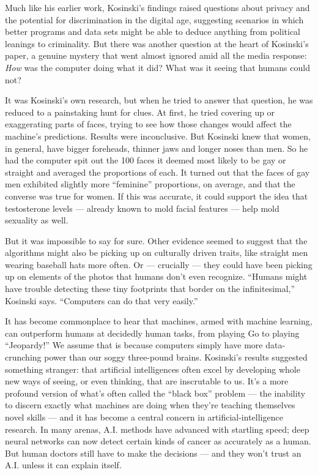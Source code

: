 Much like his earlier work, Kosinski's findings raised questions about
privacy and the potential for discrimination in the digital age,
suggesting scenarios in which better programs and data sets might be
able to deduce anything from political leanings to criminality. But
there was another question at the heart of Kosinski's paper, a genuine
mystery that went almost ignored amid all the media response: \emph{How}
was the computer doing what it did? What was it seeing that humans could
not?

It was Kosinski's own research, but when he tried to answer that
question, he was reduced to a painstaking hunt for clues. At first, he
tried covering up or exaggerating parts of faces, trying to see how
those changes would affect the machine's predictions. Results were
inconclusive. But Kosinski knew that women, in general, have bigger
foreheads, thinner jaws and longer noses than men. So he had the
computer spit out the 100 faces it deemed most likely to be gay or
straight and averaged the proportions of each. It turned out that the
faces of gay men exhibited slightly more ``feminine'' proportions, on
average, and that the converse was true for women. If this was accurate,
it could support the idea that testosterone levels --- already known to
mold facial features --- help mold sexuality as well.

But it was impossible to say for sure. Other evidence seemed to suggest
that the algorithms might also be picking up on culturally driven
traits, like straight men wearing baseball hats more often. Or ---
crucially --- they could have been picking up on elements of the photos
that humans don't even recognize. ``Humans might have trouble detecting
these tiny footprints that border on the infinitesimal,'' Kosinski says.
``Computers can do that very easily.''

It has become commonplace to hear that machines, armed with machine
learning, can outperform humans at decidedly human tasks, from playing
Go to playing ``Jeopardy!'' We assume that is because computers simply
have more data-crunching power than our soggy three-pound brains.
Kosinski's results suggested something stranger: that artificial
intelligences often excel by developing whole new ways of seeing, or
even thinking, that are inscrutable to us. It's a more profound version
of what's often called the ``black box'' problem --- the inability to
discern exactly what machines are doing when they're teaching themselves
novel skills --- and it has become a central concern in
artificial-intelligence research. In many arenas, A.I. methods have
advanced with startling speed; deep neural networks can now detect
certain kinds of cancer as accurately as a human. But human doctors
still have to make the decisions --- and they won't trust an A.I. unless
it can explain itself.

